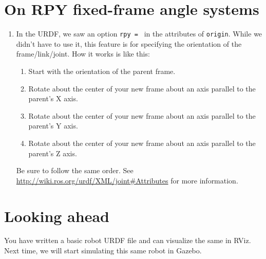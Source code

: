 \documentclass{article}
\begin{document}
    \section{On RPY fixed-frame angle systems}
        \begin{enumerate}
            \item In the URDF, we saw an option \texttt{rpy = } in the attributes of \texttt{origin}.
            While we didn't have to use it, this feature is for specifying the orientation of the frame/link/joint.
            How it works is like this:
            \begin{enumerate}
                \item Start with the orientation of the parent frame.
                \item Rotate about the center of your new frame about an axis parallel to the parent's X axis.
                \item Rotate about the center of your new frame about an axis parallel to the parent's Y axis.
                \item Rotate about the center of your new frame about an axis parallel to the parent's Z axis.
            \end{enumerate}
            Be sure to follow the same order. See \url{http://wiki.ros.org/urdf/XML/joint#Attributes} for more 
            information.
        \end{enumerate}
    \section{Looking ahead}
    You have written a basic robot URDF file and can visualize the same in RViz. Next time, we will 
    start simulating this same robot in Gazebo.
\end{document}
